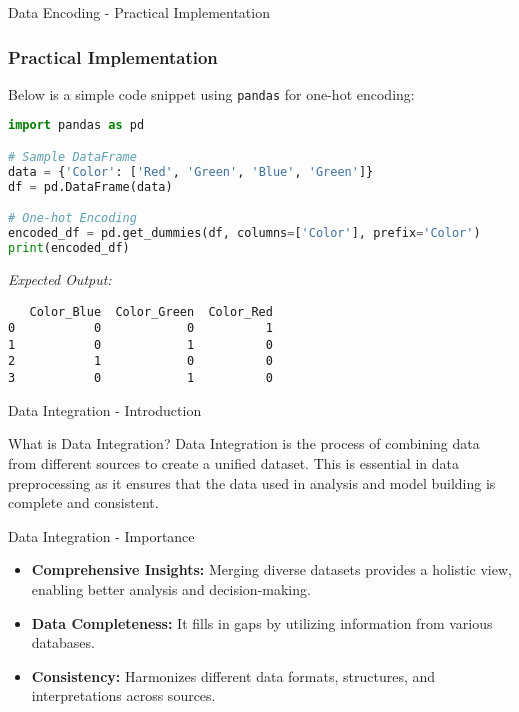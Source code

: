 \documentclass[aspectratio=169]{beamer}
\begin{document}
\begin{frame}[fragile]{Data Encoding - Practical Implementation}
    \frametitle{Practical Implementation}

    Below is a simple code snippet using \texttt{pandas} for one-hot encoding:

    \begin{lstlisting}[language=Python]
import pandas as pd

# Sample DataFrame
data = {'Color': ['Red', 'Green', 'Blue', 'Green']}
df = pd.DataFrame(data)

# One-hot Encoding
encoded_df = pd.get_dummies(df, columns=['Color'], prefix='Color')
print(encoded_df)
    \end{lstlisting}

    \textit{Expected Output:}
    \begin{verbatim}
   Color_Blue  Color_Green  Color_Red
0           0            0          1
1           0            1          0
2           1            0          0
3           0            1          0
    \end{verbatim}
\end{frame}

\begin{frame}[fragile]{Data Integration - Introduction}
    \begin{block}{What is Data Integration?}
        Data Integration is the process of combining data from different sources to create a unified dataset. This is essential in data preprocessing as it ensures that the data used in analysis and model building is complete and consistent.
    \end{block}
\end{frame}

\begin{frame}[fragile]{Data Integration - Importance}
    \begin{itemize}
        \item \textbf{Comprehensive Insights:} Merging diverse datasets provides a holistic view, enabling better analysis and decision-making.
        \item \textbf{Data Completeness:} It fills in gaps by utilizing information from various databases.
        \item \textbf{Consistency:} Harmonizes different data formats, structures, and interpretations across sources.
    \end{itemize}
\end{frame}
\end{document}
